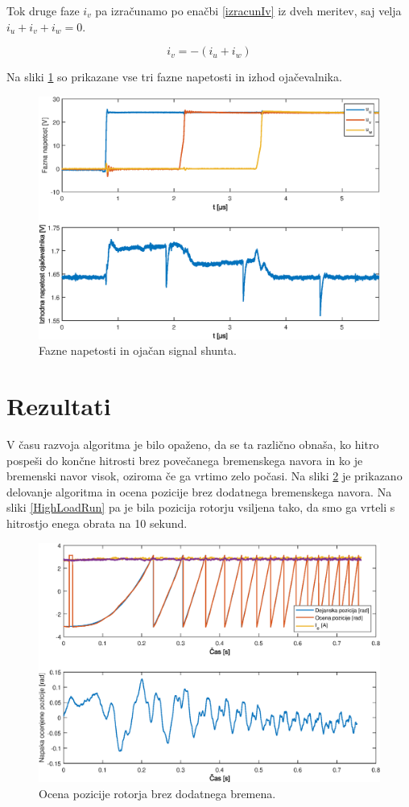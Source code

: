 \documentclass[a4paper,twoside,openright,12pt,slovene]{book}
\begin{document}
Tok druge faze $i_v$ pa izračunamo po enačbi \ref{izracunIv} iz dveh meritev, saj velja $i_u + i_v + i_w = 0$.

\begin{equation} \label{izracunIv}
i_v = -(i_u + i_w)
\end{equation}

Na sliki \ref{fazeInShunt} so prikazane vse tri fazne napetosti in izhod ojačevalnika.

\begin{figure}[!htbp]
    \centering
    \includegraphics[width=0.75\columnwidth]{Slike/fazeInShunt.eps}
    \caption{\label{fazeInShunt} Fazne napetosti in ojačan signal shunta. }
\end{figure}


\section{Rezultati} \label{rezultati}

V času razvoja algoritma je bilo opaženo, da se ta različno obnaša, ko hitro pospeši do končne hitrosti brez povečanega bremenskega navora in ko je bremenski navor visok, oziroma če ga vrtimo zelo
počasi. Na sliki \ref{NoLoadRun} je prikazano delovanje algoritma in ocena pozicije brez dodatnega bremenskega navora. Na sliki \ref{HighLoadRun} pa je bila pozicija rotorju vsiljena tako, da smo ga
vrteli s hitrostjo enega obrata na 10 sekund.

\begin{figure}[!htbp]
    \centering
    \includegraphics[width=0.8\columnwidth]{Slike/NoLoadRun.eps}
    \caption{\label{NoLoadRun} Ocena pozicije rotorja brez dodatnega bremena. }
\end{figure}
\end{document}
